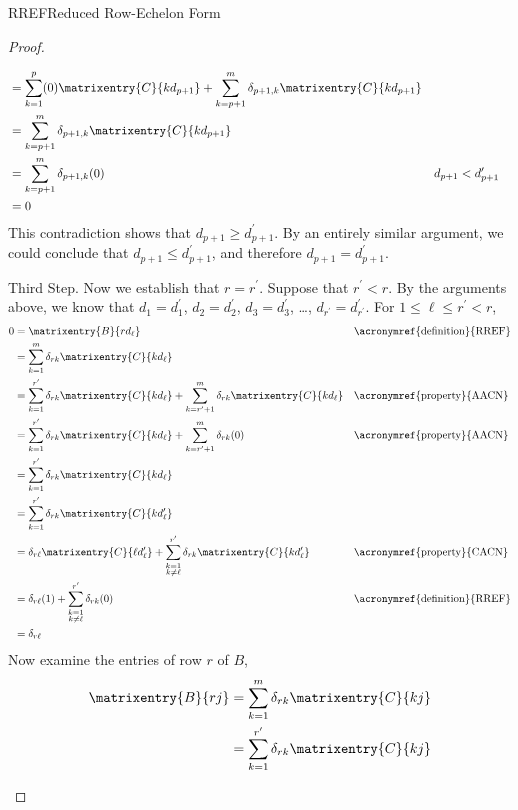 \begin{subsect}{RREF}{Reduced Row-Echelon Form}
\begin{proof}
\begin{para}
\begin{align*}
%
&=
\sum_{k=1}^{p}(0)\matrixentry{C}{kd_{p+1}}+
\sum_{k=p+1}^{m}\delta_{p+1,k}\matrixentry{C}{kd_{p+1}}\\
%
&=\sum_{k=p+1}^{m}\delta_{p+1,k}\matrixentry{C}{kd_{p+1}}\\
%
&=\sum_{k=p+1}^{m}\delta_{p+1,k}(0)
&&d_{p+1}<d^\prime_{p+1}\\
%
&=0
%
\end{align*}
%
This contradiction shows that
$d_{p+1}\geq d^\prime_{p+1}$.  By an entirely similar argument, we could conclude that $d_{p+1}\leq d^\prime_{p+1}$, and therefore $d_{p+1}=d^\prime_{p+1}$.\end{para}
%
\begin{para}
Third Step.  Now we establish that $r=r^\prime$.  Suppose that $r^\prime<r$.  By the arguments above, we know that $d_1=d^\prime_1$, $d_2=d^\prime_2$, $d_3=d^\prime_3$, \dots, $d_{r^\prime}=d^\prime_{r^\prime}$.   For $1\leq\ell\leq r^\prime<r$,
%
\begin{align*}
0
&=\matrixentry{B}{rd_\ell}
&&\text{\acronymref{definition}{RREF}}\\
%
&=\sum_{k=1}^{m}\delta_{rk}\matrixentry{C}{kd_\ell}\\
%
&=
\sum_{k=1}^{r^\prime}\delta_{rk}\matrixentry{C}{kd_\ell}
+
\sum_{k=r^\prime+1}^{m}\delta_{rk}\matrixentry{C}{kd_\ell}
&&\text{\acronymref{property}{AACN}}\\%
%
&=
\sum_{k=1}^{r^\prime}\delta_{rk}\matrixentry{C}{kd_\ell}
+
\sum_{k=r^\prime+1}^{m}\delta_{rk}(0)
&&\text{\acronymref{property}{AACN}}\\
%
&=\sum_{k=1}^{r^\prime}\delta_{rk}\matrixentry{C}{kd_\ell}\\
%
&=\sum_{k=1}^{r^\prime}\delta_{rk}\matrixentry{C}{kd^\prime_\ell}\\
%
&=
\delta_{r\ell}\matrixentry{C}{\ell d^\prime_\ell}
+
\sum_{\substack{k=1\\k\neq\ell}}^{r^\prime}\delta_{rk}\matrixentry{C}{kd^\prime_\ell}
&&\text{\acronymref{property}{CACN}}\\
%
&=
\delta_{r\ell}(1)
+
\sum_{\substack{k=1\\k\neq\ell}}^{r^\prime}\delta_{rk}(0)
&&\text{\acronymref{definition}{RREF}}\\
%
&=\delta_{r\ell}
%
\end{align*}
%
Now examine the entries of row $r$ of $B$,
%
\begin{align*}
\matrixentry{B}{rj}
&=\sum_{k=1}^{m}\delta_{rk}\matrixentry{C}{kj}\\
%
&=
\sum_{k=1}^{r^\prime}\delta_{rk}\matrixentry{C}{kj}

\end{align*}
\end{para}
\end{proof}
\end{subsect}
